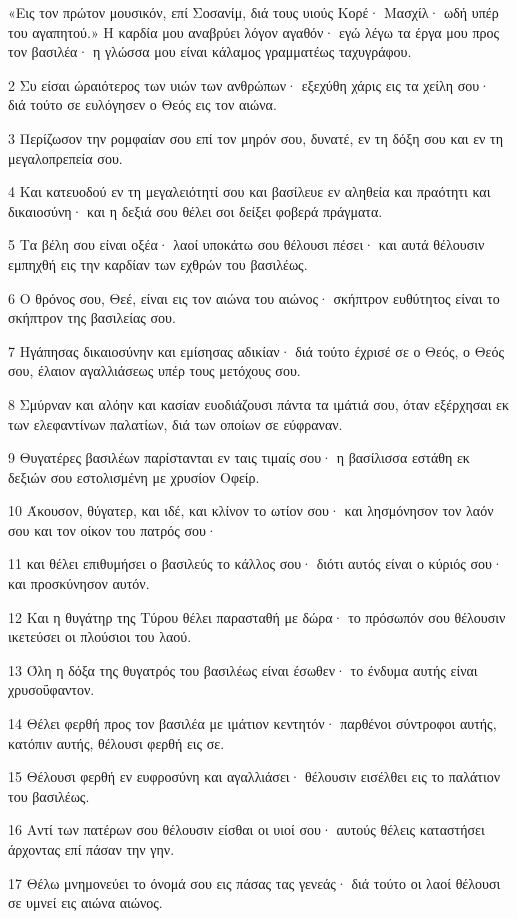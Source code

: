 \par «Εις τον πρώτον μουσικόν, επί Σοσανίμ, διά τους υιούς Κορέ· Μασχίλ· ωδή υπέρ του αγαπητού.» Η καρδία μου αναβρύει λόγον αγαθόν· εγώ λέγω τα έργα μου προς τον βασιλέα· η γλώσσα μου είναι κάλαμος γραμματέως ταχυγράφου.
\par 2 Συ είσαι ώραιότερος των υιών των ανθρώπων· εξεχύθη χάρις εις τα χείλη σου· διά τούτο σε ευλόγησεν ο Θεός εις τον αιώνα.
\par 3 Περίζωσον την ρομφαίαν σου επί τον μηρόν σου, δυνατέ, εν τη δόξη σου και εν τη μεγαλοπρεπεία σου.
\par 4 Και κατευοδού εν τη μεγαλειότητί σου και βασίλευε εν αληθεία και πραότητι και δικαιοσύνη· και η δεξιά σου θέλει σοι δείξει φοβερά πράγματα.
\par 5 Τα βέλη σου είναι οξέα· λαοί υποκάτω σου θέλουσι πέσει· και αυτά θέλουσιν εμπηχθή εις την καρδίαν των εχθρών του βασιλέως.
\par 6 Ο θρόνος σου, Θεέ, είναι εις τον αιώνα του αιώνος· σκήπτρον ευθύτητος είναι το σκήπτρον της βασιλείας σου.
\par 7 Ηγάπησας δικαιοσύνην και εμίσησας αδικίαν· διά τούτο έχρισέ σε ο Θεός, ο Θεός σου, έλαιον αγαλλιάσεως υπέρ τους μετόχους σου.
\par 8 Σμύρναν και αλόην και κασίαν ευοδιάζουσι πάντα τα ιμάτιά σου, όταν εξέρχησαι εκ των ελεφαντίνων παλατίων, διά των οποίων σε εύφραναν.
\par 9 Θυγατέρες βασιλέων παρίστανται εν ταις τιμαίς σου· η βασίλισσα εστάθη εκ δεξιών σου εστολισμένη με χρυσίον Οφείρ.
\par 10 Άκουσον, θύγατερ, και ιδέ, και κλίνον το ωτίον σου· και λησμόνησον τον λαόν σου και τον οίκον του πατρός σου·
\par 11 και θέλει επιθυμήσει ο βασιλεύς το κάλλος σου· διότι αυτός είναι ο κύριός σου· και προσκύνησον αυτόν.
\par 12 Και η θυγάτηρ της Τύρου θέλει παρασταθή με δώρα· το πρόσωπόν σου θέλουσιν ικετεύσει οι πλούσιοι του λαού.
\par 13 Όλη η δόξα της θυγατρός του βασιλέως είναι έσωθεν· το ένδυμα αυτής είναι χρυσοΰφαντον.
\par 14 Θέλει φερθή προς τον βασιλέα με ιμάτιον κεντητόν· παρθένοι σύντροφοι αυτής, κατόπιν αυτής, θέλουσι φερθή εις σε.
\par 15 Θέλουσι φερθή εν ευφροσύνη και αγαλλιάσει· θέλουσιν εισέλθει εις το παλάτιον του βασιλέως.
\par 16 Αντί των πατέρων σου θέλουσιν είσθαι οι υιοί σου· αυτούς θέλεις καταστήσει άρχοντας επί πάσαν την γην.
\par 17 Θέλω μνημονεύει το όνομά σου εις πάσας τας γενεάς· διά τούτο οι λαοί θέλουσι σε υμνεί εις αιώνα αιώνος.


